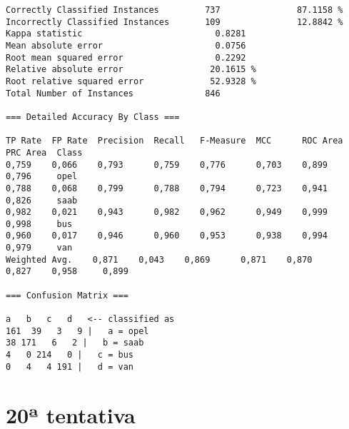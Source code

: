 \documentclass[
	article,			%
	11pt,				%
	oneside,			%
	a4paper,			%
	english,			%
	brazil,				%
	sumario=tradicional
	]{abntex2}
\begin{document}
\begin{lstlisting}
Correctly Classified Instances         737               87.1158 %
Incorrectly Classified Instances       109               12.8842 %
Kappa statistic                          0.8281
Mean absolute error                      0.0756
Root mean squared error                  0.2292
Relative absolute error                 20.1615 %
Root relative squared error             52.9328 %
Total Number of Instances              846     

=== Detailed Accuracy By Class ===

TP Rate  FP Rate  Precision  Recall   F-Measure  MCC      ROC Area  PRC Area  Class
0,759    0,066    0,793      0,759    0,776      0,703    0,899     0,796     opel
0,788    0,068    0,799      0,788    0,794      0,723    0,941     0,826     saab
0,982    0,021    0,943      0,982    0,962      0,949    0,999     0,998     bus
0,960    0,017    0,946      0,960    0,953      0,938    0,994     0,979     van
Weighted Avg.    0,871    0,043    0,869      0,871    0,870      0,827    0,958     0,899     

=== Confusion Matrix ===

a   b   c   d   <-- classified as
161  39   3   9 |   a = opel
38 171   6   2 |   b = saab
4   0 214   0 |   c = bus
0   4   4 191 |   d = van

\end{lstlisting}

\section{20ª tentativa}
\end{document}
